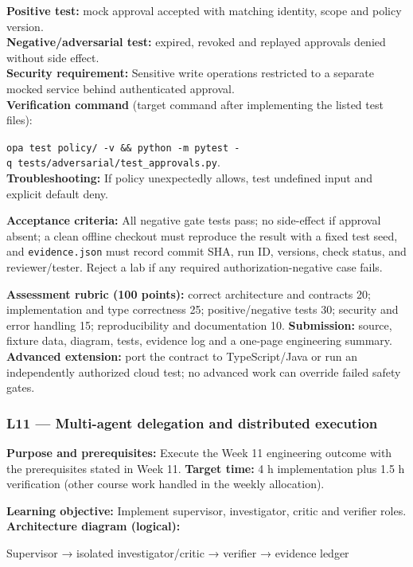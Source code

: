 \documentclass[
  10pt,
]{article}
\newenvironment{Shaded}{\begin{snugshade}}{\end{snugshade}}
\newcommand{\NormalTok}[1]{#1}
\begin{document}
\textbf{Positive test:} mock approval accepted with matching identity,
scope and policy version.\\
\textbf{Negative/adversarial test:} expired, revoked and replayed
approvals denied without side effect.\\
\textbf{Security requirement:} Sensitive write operations restricted to
a separate mocked service behind authenticated approval.\\
\textbf{Verification command} (target command after implementing the
listed test files):\par\noindent
\texttt{opa\ test\ policy/\ -v\ \&\&\ python\ -m\ pytest\ -q\ tests/adversarial/test\_approvals.py}.\\
\textbf{Troubleshooting:} If policy unexpectedly allows, test undefined
input and explicit default deny.

\textbf{Acceptance criteria:} All negative gate tests pass; no
side-effect if approval absent; a clean offline checkout must reproduce
the result with a fixed test seed, and \texttt{evidence.json} must
record commit SHA, run ID, versions, check status, and reviewer/tester.
Reject a lab if any required authorization-negative case fails.

\textbf{Assessment rubric (100 points):} correct architecture and
contracts 20; implementation and type correctness 25; positive/negative
tests 30; security and error handling 15; reproducibility and
documentation 10. \textbf{Submission:} source, fixture data, diagram,
tests, evidence log and a one-page engineering summary. \textbf{Advanced
extension:} port the contract to TypeScript/Java or run an independently
authorized cloud test; no advanced work can override failed safety
gates.

\subsubsection{L11 --- Multi-agent delegation and distributed
execution}\label{l11-multi-agent-delegation-and-distributed-execution}

\textbf{Purpose and prerequisites:} Execute the Week 11 engineering
outcome with the prerequisites stated in Week 11. \textbf{Target time:}
4 h implementation plus 1.5 h verification (other course work handled in
the weekly allocation).

\textbf{Learning objective:} Implement supervisor, investigator, critic
and verifier roles. \textbf{Architecture diagram (logical):}

\begin{Shaded}
\begin{Highlighting}[]
\NormalTok{Supervisor → isolated investigator/critic → verifier →}
\NormalTok{evidence ledger}
\end{Highlighting}
\end{Shaded}
\end{document}
